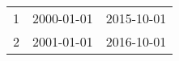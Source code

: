 % 
\begin{tabular}{ccc}
  \hline
  \hline
1 & 2000-01-01 & 2015-10-01 \\ 
  2 & 2001-01-01 & 2016-10-01 \\ 
   \hline
\end{tabular}
